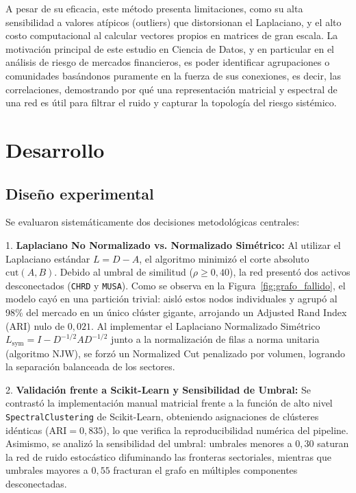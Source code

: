 \documentclass{article}
\begin{document}
	A pesar de su eficacia, este método presenta limitaciones, como su alta sensibilidad a valores atípicos (outliers) que distorsionan el Laplaciano, y el alto costo computacional al calcular vectores propios en matrices de gran escala. La motivación principal de este estudio en Ciencia de Datos, y en particular en el análisis de riesgo de mercados financieros, es poder identificar agrupaciones o comunidades basándonos puramente en la fuerza de sus conexiones, es decir, las correlaciones, demostrando por qué una representación matricial y espectral de una red es útil para filtrar el ruido y capturar la topología del riesgo sistémico.
	
	\section*{Desarrollo}
	\subsection*{Diseño experimental}
	Se evaluaron sistemáticamente dos decisiones metodológicas centrales:
	
	1. \textbf{Laplaciano No Normalizado vs. Normalizado Simétrico:} 
	Al utilizar el Laplaciano estándar \(L = D - A\), el algoritmo minimizó el corte absoluto \(\text{cut}(A,B)\). Debido al umbral de similitud (\(\rho \ge 0,40\)), la red presentó dos activos desconectados (\texttt{CHRD} y \texttt{MUSA}). Como se observa en la Figura~\ref{fig:grafo_fallido}, el modelo cayó en una partición trivial: aisló estos nodos individuales y agrupó al 98\% del mercado en un único clúster gigante, arrojando un Adjusted Rand Index (ARI) nulo de $0,021$. Al implementar el Laplaciano Normalizado Simétrico \(L_{\text{sym}} = I - D^{-1/2}AD^{-1/2}\) junto a la normalización de filas a norma unitaria (algoritmo NJW), se forzó un Normalized Cut penalizado por volumen, logrando la separación balanceada de los sectores.
	
	2. \textbf{Validación frente a Scikit-Learn y Sensibilidad de Umbral:}
	Se contrastó la implementación manual matricial frente a la función de alto nivel \texttt{SpectralClustering} de Scikit-Learn, obteniendo asignaciones de clústeres idénticas (\(\text{ARI} = 0,835\)), lo que verifica la reproducibilidad numérica del pipeline. Asimismo, se analizó la sensibilidad del umbral: umbrales menores a $0,30$ saturan la red de ruido estocástico difuminando las fronteras sectoriales, mientras que umbrales mayores a $0,55$ fracturan el grafo en múltiples componentes desconectadas.
	
\end{document}
